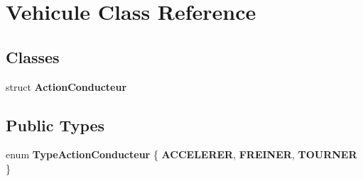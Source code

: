\section{\-Vehicule \-Class \-Reference}
\label{class_vehicule}
\subsection*{\-Classes}
\begin{DoxyCompactItemize}
\item 
struct {\bf \-Action\-Conducteur}
\end{DoxyCompactItemize}
\subsection*{\-Public \-Types}
\begin{DoxyCompactItemize}
\item 
enum {\bfseries \-Type\-Action\-Conducteur} \{ {\bfseries \-A\-C\-C\-E\-L\-E\-R\-E\-R}, 
{\bfseries \-F\-R\-E\-I\-N\-E\-R}, 
{\bfseries \-T\-O\-U\-R\-N\-E\-R}
 \}
\end{DoxyCompactItemize}
